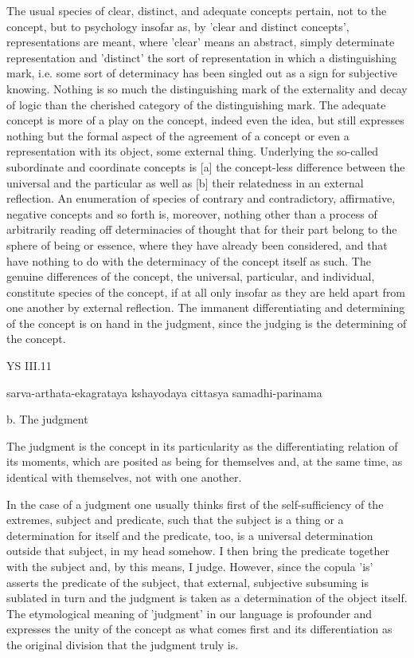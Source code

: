 The usual species of clear, distinct, and adequate concepts pertain,
not to the concept, but to psychology insofar as,
by 'clear and distinct concepts', representations are meant,
where 'clear' means an abstract, simply determinate representation
and 'distinct' the sort of representation in which
a distinguishing mark, i.e. some sort of determinacy
has been singled out as a sign for subjective knowing.
Nothing is so much the distinguishing mark of
the externality and decay of logic
than the cherished category of the distinguishing mark.
The adequate concept is more of
a play on the concept, indeed even the idea,
but still expresses nothing but the formal aspect of
the agreement of a concept or even a representation
with its object, some external thing.
Underlying the so-called subordinate and coordinate concepts is
[a] the concept-less difference between the universal and the particular
as well as [b] their relatedness in an external reflection.
An enumeration of species of contrary and contradictory,
affirmative, negative concepts and so forth is, moreover,
nothing other than a process of arbitrarily reading off
determinacies of thought that for their part belong to
the sphere of being or essence,
where they have already been considered,
and that have nothing to do
with the determinacy of the concept itself as such.
The genuine differences of the concept,
the universal, particular, and individual,
constitute species of the concept,
if at all only insofar as they are held apart
from one another by external reflection.
The immanent differentiating and determining of
the concept is on hand in the judgment,
since the judging is the determining of the concept.

YS III.11

sarva-arthata-ekagrataya kshayodaya cittasya samadhi-parinama

b. The judgment

The judgment is the concept in its particularity as
the differentiating relation of its moments,
which are posited as being for themselves
and, at the same time, as identical with themselves,
not with one another.

In the case of a judgment one usually thinks first of
the self-sufficiency of the extremes, subject and predicate,
such that the subject is a thing or a determination for itself
and the predicate, too, is a universal determination
outside that subject, in my head somehow.
I then bring the predicate together with the subject
and, by this means, I judge.
However, since the copula 'is' asserts the predicate of the subject,
that external, subjective subsuming is sublated in turn
and the judgment is taken as a determination of the object itself.
The etymological meaning of 'judgment' in our language is
profounder and expresses the unity of the concept
as what comes first and its differentiation
as the original division that the judgment truly is.

